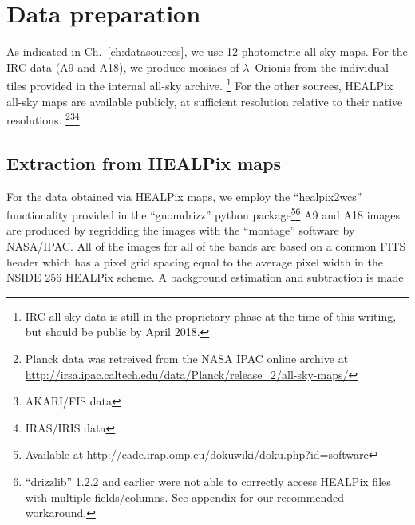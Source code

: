 	\section{Data preparation}
		As indicated in Ch.~\ref{ch:datasources}, we use 12 photometric all-sky maps. For the IRC data (A9 and A18), we produce mosiacs of $\lambda$~Orionis from the individual tiles provided in the internal all-sky archive.
      \footnote{IRC all-sky data is still in the proprietary phase at the time of this writing, but should be public by April 2018.}
       For the other sources, HEALPix all-sky maps are available publicly, at sufficient resolution relative to their native resolutions. \footnote{Planck data was retreived from the NASA IPAC online archive at \url{http://irsa.ipac.caltech.edu/data/Planck/release_2/all-sky-maps/}}\footnote{AKARI/FIS data }\footnote{IRAS/IRIS data }

		\subsection{Extraction from HEALPix maps}
		  For the data obtained via HEALPix maps, we employ the ``healpix2wcs'' functionality provided in the ``gnomdrizz'' python package\footnote{Available at \url{http://cade.irap.omp.eu/dokuwiki/doku.php?id=software}}\footnote{``drizzlib'' 1.2.2 and earlier were not able to correctly access HEALPix files with multiple fields/columns. See appendix for our recommended workaround.} A9 and A18 images are produced by regridding the images with the ``montage'' software by NASA/IPAC. All of the images for all of the bands are based on a common FITS header which has a pixel grid spacing equal to the average pixel width in the NSIDE 256 HEALPix scheme.
      A background estimation and subtraction is made

